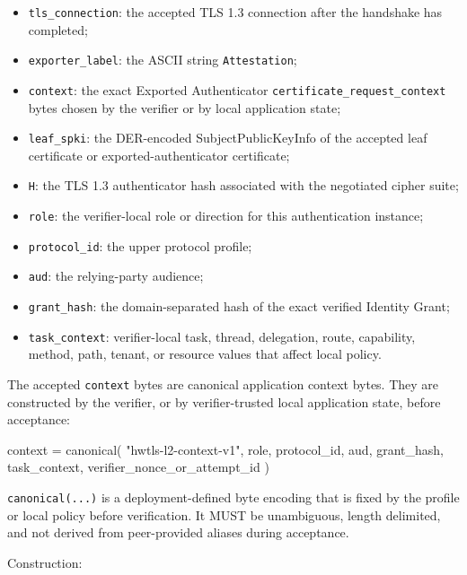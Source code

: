 \documentclass[
]{article}
\newenvironment{Shaded}{}{}
\newcommand{\NormalTok}[1]{#1}
\providecommand{\tightlist}{%
  \setlength{\itemsep}{0pt}\setlength{\parskip}{0pt}}
\begin{document}
\begin{itemize}
\tightlist
\item
  \texttt{tls\_connection}: the accepted TLS 1.3 connection after the
  handshake has completed;
\item
  \texttt{exporter\_label}: the ASCII string \texttt{Attestation};
\item
  \texttt{context}: the exact Exported Authenticator
  \texttt{certificate\_request\_context} bytes chosen by the verifier or
  by local application state;
\item
  \texttt{leaf\_spki}: the DER-encoded SubjectPublicKeyInfo of the
  accepted leaf certificate or exported-authenticator certificate;
\item
  \texttt{H}: the TLS 1.3 authenticator hash associated with the
  negotiated cipher suite;
\item
  \texttt{role}: the verifier-local role or direction for this
  authentication instance;
\item
  \texttt{protocol\_id}: the upper protocol profile;
\item
  \texttt{aud}: the relying-party audience;
\item
  \texttt{grant\_hash}: the domain-separated hash of the exact verified
  Identity Grant;
\item
  \texttt{task\_context}: verifier-local task, thread, delegation,
  route, capability, method, path, tenant, or resource values that
  affect local policy.
\end{itemize}

The accepted \texttt{context} bytes are canonical application context
bytes. They are constructed by the verifier, or by verifier-trusted
local application state, before acceptance:

\begin{Shaded}
\begin{Highlighting}[]
\NormalTok{context = canonical(}
\NormalTok{  "hwtls-l2-context-v1",}
\NormalTok{  role, protocol_id, aud, grant_hash,}
\NormalTok{  task_context, verifier_nonce_or_attempt_id}
\NormalTok{)}
\end{Highlighting}
\end{Shaded}

\texttt{canonical(...)} is a deployment-defined byte encoding that is
fixed by the profile or local policy before verification. It MUST be
unambiguous, length delimited, and not derived from peer-provided
aliases during acceptance.

Construction:
\end{document}
